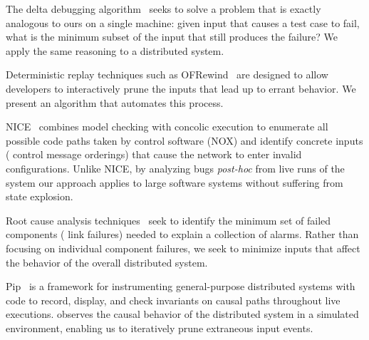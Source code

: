 
The delta debugging algorithm~\cite{Zeller:2002:SIF:506201.506206} seeks to solve
a problem that is exactly analogous to ours on a single machine: given input that causes a test case
to fail, what is the minimum subset of the input that still produces the failure?
We apply the same reasoning to a distributed system.


Deterministic replay techniques such as OFRewind~\cite{ofrewind}
are designed to allow developers to interactively prune
the inputs that lead up to errant behavior. We present an algorithm that
automates this process.


NICE~\cite{nice} combines model checking with concolic execution
to enumerate all possible code paths taken by control software (NOX)
and identify concrete inputs (\eg{} control message orderings) that cause
the network to enter invalid configurations. Unlike NICE, by analyzing
bugs {\em post-hoc} from live runs of the system our approach applies
to large software systems without suffering from state explosion.




Root cause analysis techniques~\cite{577079} seek to identify the minimum set of failed
components (\eg{} link failures) needed to explain a collection of alarms. Rather than
focusing on individual component failures, we seek to minimize inputs that affect the behavior
of the overall distributed system.


Pip~\cite{pip} is a framework for instrumenting general-purpose distributed systems
with code to record, display, and check invariants on causal paths throughout
live executions. \Simulator{} observes the causal behavior of the
distributed system in a simulated environment, enabling us to iteratively prune extraneous input events.

%

